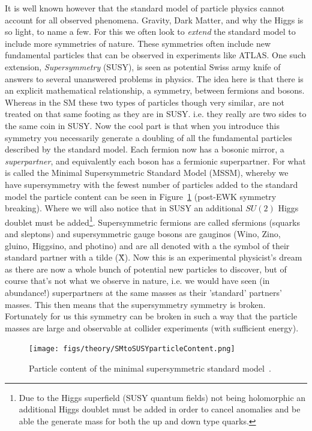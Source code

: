 It is well known however that the standard model of particle physics cannot account for all observed phenomena.
Gravity, Dark Matter, and why the Higgs is so light, to name a few.
For this we often look to \emph{extend} the standard model to include more symmetries of nature.
These symmetries often include new fundamental particles that can be observed in experiments like ATLAS.
One such extension, \emph{Supersymmetry} (SUSY), is seen as potential Swiss army knife of answers to several unanswered problems in physics.
The idea here is that there is an explicit mathematical relationship, a symmetry, between fermions and bosons.
Whereas in the SM these two types of particles though very similar, are not treated on that same footing as they are in SUSY.
i.e. they really are two sides to the same coin in SUSY. 
Now the cool part is that when you introduce this symmetry you necessarily generate a doubling of all the fundamental particles described by the standard model.
Each fermion now has a bosonic mirror, a \emph{superpartner}, and equivalently each boson has a fermionic superpartner.
For what is called the Minimal Supersymmetric Standard Model (MSSM), whereby we have supersymmetry with the fewest number of particles added to the standard model the particle content can be seen in Figure~\ref{fig:theory:particlesSUSY} (post-EWK symmetry breaking).
Where we will also notice that in SUSY an additional $SU(2)$ Higgs doublet must be added\footnote{Due to the Higgs superfield (SUSY quantum fields) not being holomorphic an additional Higgs doublet must be added in order to cancel anomalies and be able the generate mass for both the up and down type quarks.}.
Supersymmetric fermions are called sfermions (squarks and sleptons) and supersymmetric gauge bosons are gauginos (Wino, Zino, gluino, Higgsino, and photino) and are all denoted with a the symbol of their standard partner with a tilde (\~X).
Now this is an experimental physicist's dream as there are now a whole bunch of potential new particles to discover, but of course that's not what we observe in nature, i.e. we would have seen (in abundance!) superpartners at the same masses as their 'standard' partners' masses.
This then means that the supersymmetry symmetry is broken.
Fortunately for us this symmetry can be broken in such a way that the particle masses are large and observable at collider experiments (with sufficient energy).
\begin{figure}[tbp]
  \begin{center}
    \texttt{[image: figs/theory/SMtoSUSYparticleContent.png]}
  \end{center}
  \caption[Particle content of the minimal supersymmetric standard model]{Particle content of the minimal supersymmetric standard model~\cite{KEK:2012}.}
  \label{fig:theory:particlesSUSY}
\end{figure}

